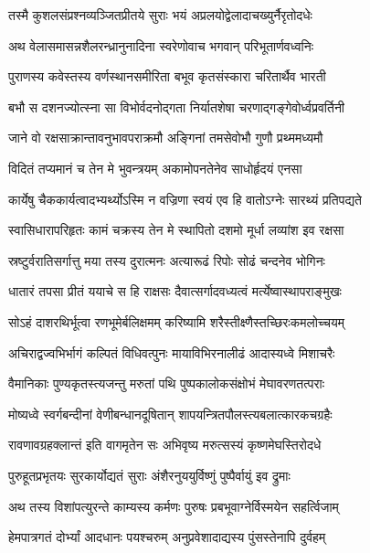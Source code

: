 \twolineshloka
{तस्मै कुशलसंप्रश्नव्यञ्जितप्रीतये सुराः}
{भयं अप्रलयोद्वेलादाचख्युर्नैरृतोदधेः}%

\twolineshloka
{अथ वेलासमासन्नशैलरन्ध्रानुनादिना}
{स्वरेणोवाच भगवान् परिभूतार्णवध्वनिः}%

\twolineshloka
{पुराणस्य कवेस्तस्य वर्णस्थानसमीरिता}
{बभूव कृतसंस्कारा चरितार्थैव भारती}%

\twolineshloka
{बभौ स दशनज्योत्स्ना सा विभोर्वदनोद्गता}
{निर्यातशेषा चरणाद्गङ्गेवोर्ध्वप्रवर्तिनी}%

\twolineshloka
{जाने वो रक्षसाक्रान्तावनुभावपराक्रमौ}
{अङ्गिनां तमसेवोभौ गुणौ प्रथ्ममध्यमौ}%

\twolineshloka
{विदितं तप्यमानं च तेन मे भुवन्त्रयम्}
{अकामोपनतेनेव साधोर्हृदयं एनसा}%

\twolineshloka
{कार्येषु चैककार्यत्वादभ्यर्थ्योऽस्मि न वज्रिणा}
{स्वयं एव हि वातोऽग्नेः सारथ्यं प्रतिपद्यते}%

\twolineshloka
{स्वासिधारापरिहृतः कामं चक्रस्य तेन मे}
{स्थापितो दशमो मूर्धा लव्यांश इव रक्षसा}%

\twolineshloka
{स्रष्टुर्वरातिसर्गात्तु मया तस्य दुरात्मनः}
{अत्यारूढं रिपोः सोढं चन्दनेव भोगिनः}%

\twolineshloka
{धातारं तपसा प्रीतं ययाचे स हि राक्षसः}
{दैवात्सर्गादवध्यत्वं मर्त्येष्वास्थापराङ्मुखः}%

\twolineshloka
{सोऽहं दाशरथिर्भूत्वा रणभूमेर्बलिक्षमम्}
{करिष्यामि शरैस्तीक्ष्णैस्तच्छिरःकमलोच्चयम्}%

\twolineshloka
{अचिराद्वज्वभिर्भागं कल्पितं विधिवत्पुनः}
{मायाविभिरनालीढं आदास्यध्वे मिशाचरैः}%

\twolineshloka
{वैमानिकाः पुण्यकृतस्त्यजन्तु मरुतां पथि}
{पुष्पकालोकसंक्षोभं मेघावरणतत्पराः}%

\twolineshloka
{मोष्यध्वे स्वर्गबन्दीनां वेणीबन्धानदूषितान्}
{शापयन्त्रितपौलस्त्यबलात्कारकचग्रहैः}%

\twolineshloka
{रावणावग्रहक्लान्तं इति वागमृतेन सः}
{अभिवृष्य मरुत्सस्यं कृष्णमेघस्तिरोदधे}%

\twolineshloka
{पुरुहूतप्रभृतयः सुरकार्योद्यतं सुराः}
{अंशैरनुययुर्विष्णुं पुष्पैर्वायुं इव द्रुमाः}%

\twolineshloka
{अथ तस्य विशांपत्युरन्ते काम्यस्य कर्मणः}
{पुरुषः प्रबभूवाग्नेर्विस्मयेन सहर्त्विजाम्}%

\twolineshloka
{हेमपात्रगतं दोर्भ्यां आदधानः पयश्चरुम्}
{अनुप्रवेशादाद्यस्य पुंसस्तेनापि दुर्वहम्}%

